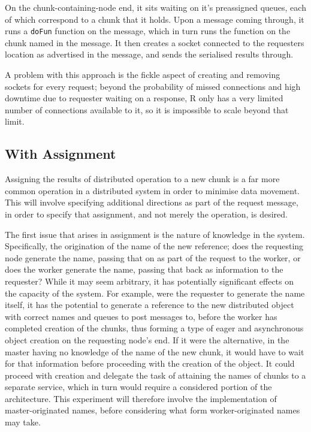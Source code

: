 \documentclass[a4paper,10pt]{article}
\begin{document}
On the chunk-containing-node end, it sits waiting on it's preassigned queues,
each of which correspond to a chunk that it holds. Upon a message coming
through, it runs a \texttt{doFun} function on the message, which in turn runs
the function on the chunk named in the message. 
It then creates a socket connected to the requesters location as advertised in
the message, and sends the serialised results through.





A problem with this approach is the fickle aspect of creating and removing
sockets for every request; beyond the probability of missed connections and
high downtime due to requester waiting on a response, R only has a very limited
number of connections available to it, so it is impossible to scale beyond that
limit.

\subsection{With Assignment}

Assigning the results of distributed operation to a new chunk is a far more
common operation in a distributed system in order to minimise data movement.
This will involve specifying additional directions as part of the request
message, in order to specify that assignment, and not merely the operation, is
desired.

The first issue that arises in assignment is the nature of knowledge in the
system.
Specifically, the origination of the name of the new reference; does the
requesting node generate the name, passing that on as part of the request to
the worker, or does the worker generate the name, passing that back as
information to the requester?
While it may seem arbitrary, it has potentially significant effects on the
capacity of the system.
For example, were the requester to generate the name itself, it has the
potential to generate a reference to the new distributed object with correct
names and queues to post messages to, before the worker has completed creation
of the chunks, thus forming a type of eager and asynchronous object creation on
the requesting node's end.
If it were the alternative, in the master having no knowledge of the name of
the new chunk, it would have to wait for that information before proceeding
with the creation of the object.
It could proceed with creation and delegate the task of attaining the names of
chunks to a separate service, which in turn would require a considered portion
of the architecture.
This experiment will therefore involve the implementation of master-originated
names, before considering what form worker-originated names may take.
\end{document}
